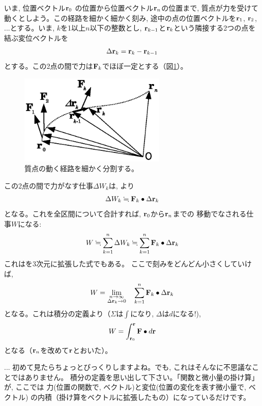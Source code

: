いま, 位置ベクトル${\bf r}_0$
の位置から位置ベクトル${\bf r}_n$の位置まで, 質点が力を受けて動くとしよう。この経路を細かく細かく刻み, 
途中の点の位置ベクトルを${\bf r}_1$, ${\bf r}_2$, ...とする。いま, $k$を1以上$n$以下の整数とし, 
${\bf r}_{k-1}$と${\bf r}_k$という隣接する2つの点を結ぶ変位ベクトルを
\begin{eqnarray}
\Delta {\bf r}_k={\bf r}_k-{\bf r}_{k-1}
\end{eqnarray}
とする。この2点の間で力は${\bf F}_k$でほぼ一定とする（図\ref{fig:work_3D}）。\mv
\begin{figure}[h]
    \centering
    \includegraphics[width=7cm]{work_3D.eps}
    \caption{質点の動く経路を細かく分割する。}\label{fig:work_3D}
\end{figure}
この2点の間で力がなす仕事$\Delta W_k$は, 
より
\begin{eqnarray} 
\Delta W_k\fallingdotseq{\bf F}_k\bullet\Delta {\bf r}_k
\end{eqnarray} 
となる。これを全区間について合計すれば, ${\bf r}_0$から${\bf r}_n$までの
移動でなされる仕事$W$になる:
\begin{eqnarray} 
W\fallingdotseq\sum_{k=1}^n \Delta W_k\fallingdotseq\sum_{k=1}^n {\bf F}_k\bullet\Delta {\bf r}_k
\end{eqnarray}
これはを3次元に拡張した式でもある。 
ここで刻みをどんどん小さくしていけば, 
\begin{eqnarray}
W=\lim_{\substack{n\rightarrow \infty\\\Delta {\bf r}_k\rightarrow 0}}\quad\sum_{k=1}^n{\bf F}_k\bullet\Delta {\bf r}_k
\end{eqnarray}
となる。これは積分の定義より（$\Sigma$は$\int$になり, $\Delta$は$d$になる!), 
\begin{eqnarray} 
W=\int_{{\bf r}_0}^{{\bf r}} {\bf F}\bullet d{\bf r}
\end{eqnarray} 
となる（${\bf r}_n$を改めて${\bf r}$とおいた）。

\begin{faq}{\small{} ... 
初めて見たらちょっとびっくりしますよね。でも, これはそんなに不思議なことではありません。
積分の定義を思い出して下さい。「関数と微小量の掛け算」が, ここでは
力(位置の関数で, ベクトル)と変位(位置の変化を表す微小量で, ベクトル)
の内積（掛け算をベクトルに拡張したもの）になっているだけです。}\end{faq}\mv

